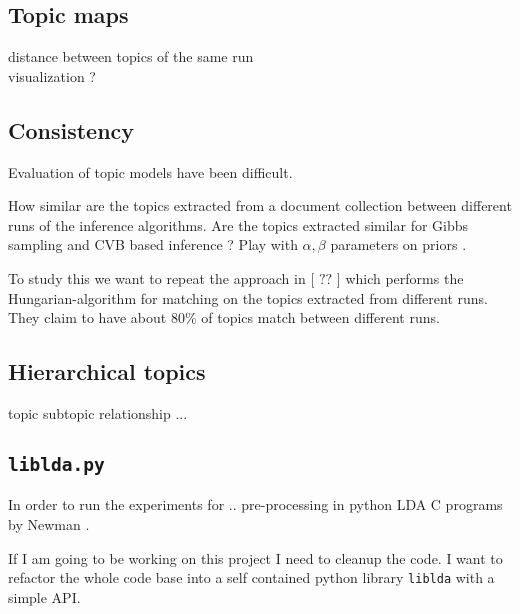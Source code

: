 \documentclass[letterpaper,12pt]{article}
\begin{document}
		\vspace{3in}		
		
		
		
	\subsection{Topic maps}
	
		distance between topics of the same run \\
		visualization ?
		
		\vspace{3in}
	
	\subsection{Consistency}
		
		Evaluation of topic models have been difficult. 
		\bigskip
		\bigskip
		
		How similar are the topics extracted from a document collection
		between different runs of the inference algorithms.
		Are the topics extracted similar for Gibbs sampling and CVB based
		inference ?
		Play with $\alpha, \beta$ parameters on priors \cite{heinrich2005parameter,wallach-rethinking}.
		
		To study this we want to repeat the approach in [ $??$ ] which 
		performs the Hungarian-algorithm for matching on the topics 
		extracted from different runs.
		They claim to have about 80\% of topics match between different runs.
		
				\vspace{3in}
		
	\subsection{Hierarchical topics}
	
		topic subtopic relationship ...
		
				\vspace{3in}
						\vspace{3in}
						

	\subsection{\texttt{liblda.py}}
	
		In order to run the experiments for ..
		pre-processing in python 
		LDA C programs by Newman  \cite{NewmanCode}.
		
		If I am going to be working on this project I need to cleanup the code.
		I want to refactor the whole
		code base into a self contained python library \texttt{liblda} with a simple API.
		
\end{document}
